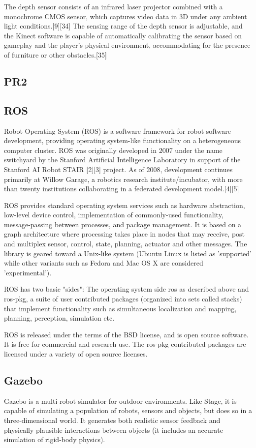 The depth sensor consists of an infrared laser projector combined with a monochrome CMOS sensor, which captures video data in 3D under any ambient light conditions.[9][34] The sensing range of the depth sensor is adjustable, and the Kinect software is capable of automatically calibrating the sensor based on gameplay and the player's physical environment, accommodating for the presence of furniture or other obstacles.[35]
\subsection{PR2}
\subsection{ROS}
Robot Operating System (ROS) is a software framework for robot software development, providing operating system-like functionality on a heterogeneous computer cluster. ROS was originally developed in 2007 under the name switchyard by the Stanford Artificial Intelligence Laboratory in support of the Stanford AI Robot STAIR [2][3] project. As of 2008, development continues primarily at Willow Garage, a robotics research institute/incubator, with more than twenty institutions collaborating in a federated development model.[4][5]

ROS provides standard operating system services such as hardware abstraction, low-level device control, implementation of commonly-used functionality, message-passing between processes, and package management. It is based on a graph architecture where processing takes place in nodes that may receive, post and multiplex sensor, control, state, planning, actuator and other messages. The library is geared toward a Unix-like system (Ubuntu Linux is listed as 'supported' while other variants such as Fedora and Mac OS X are considered 'experimental').

ROS has two basic "sides": The operating system side ros as described above and ros-pkg, a suite of user contributed packages (organized into sets called stacks) that implement functionality such as simultaneous localization and mapping, planning, perception, simulation etc.

ROS is released under the terms of the BSD license, and is open source software. It is free for commercial and research use. The ros-pkg contributed packages are licensed under a variety of open source licenses.


\subsection{Gazebo}
Gazebo is a multi-robot simulator for outdoor environments. Like Stage, it is capable of simulating a population of robots, sensors and objects, but does so in a three-dimensional world. It generates both realistic sensor feedback and physically plausible interactions between objects (it includes an accurate simulation of rigid-body physics).

